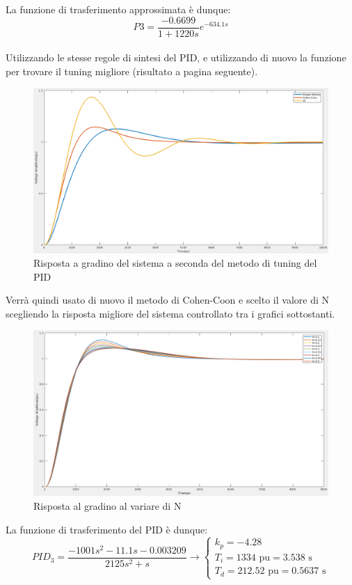 \documentclass[Lau,noexaminfo]{sapthesis}
\begin{document}
	La funzione di trasferimento approssimata è dunque:\\
	\begin{equation*}
	P3=\frac{-0.6699}{1+1220s}e^{-634.1s}
	\end{equation*}\\
	Utilizzando le stesse regole di sintesi del PID, e utilizzando di nuovo la funzione per trovare il tuning migliore (risultato a pagina seguente).
	\begin{figure}
		\centering
			\includegraphics[scale=0.26]{tuning_migliore_P3}
			\caption{Risposta a gradino del sistema a seconda del metodo di tuning del PID}
	\end{figure}
	Verrà quindi usato di nuovo il metodo di Cohen-Coon e scelto il valore di N scegliendo la risposta migliore del sistema controllato tra i grafici sottostanti.
	\begin{figure}
		\centering
			\includegraphics[scale=0.26]{vari_N_P3}
			\caption{Risposta al gradino al variare di N}
	\end{figure}
	La funzione di trasferimento del PID è dunque:\\
	\begin{equation}
	PID_3=\frac{-1001s^2-11.1s-0.003209}{2125s^2+s}\rightarrow\begin{cases}
	k_p=-4.28\\
	T_i=1334 \text{ pu} = 3.538\text{ s}\\
	T_d=212.52 \text{ pu} = 0.5637\text{ s}
	\end{cases}
	\end{equation}\\\\
\end{document}

